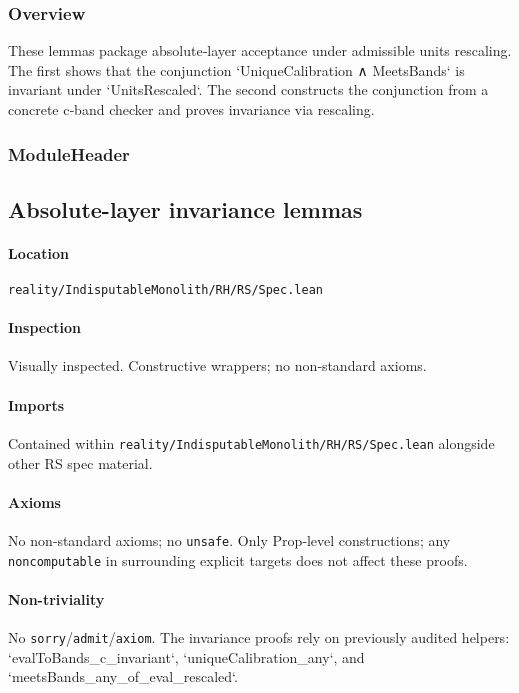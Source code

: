 \documentclass{article}
\newcommand{\FileRef}[1]{\texttt{#1}}
\newcommand{\ModuleHeader}[3]{%
  \subsection{#1}
  \paragraph{Location} \FileRef{#2}\\
  \paragraph{Inspection} #3
}
\begin{document}
\subsubsection{Overview}
These lemmas package absolute‑layer acceptance under admissible units rescaling. The first shows that the conjunction `UniqueCalibration ∧ MeetsBands` is invariant under `UnitsRescaled`. The second constructs the conjunction from a concrete c‑band checker and proves invariance via rescaling.

\subsubsection{ModuleHeader}
\ModuleHeader{Absolute-layer invariance lemmas}{reality/IndisputableMonolith/RH/RS/Spec.lean}{Visually inspected. Constructive wrappers; no non‑standard axioms.}

\paragraph{Imports}
Contained within \FileRef{reality/IndisputableMonolith/RH/RS/Spec.lean} alongside other RS spec material.

\paragraph{Axioms}
No non‑standard axioms; no \texttt{unsafe}. Only Prop‑level constructions; any \texttt{noncomputable} in surrounding explicit targets does not affect these proofs.

\paragraph{Non-triviality}
No \texttt{sorry}/\texttt{admit}/\texttt{axiom}. The invariance proofs rely on previously audited helpers: `evalToBands_c_invariant`, `uniqueCalibration_any`, and `meetsBands_any_of_eval_rescaled`.
\end{document}
